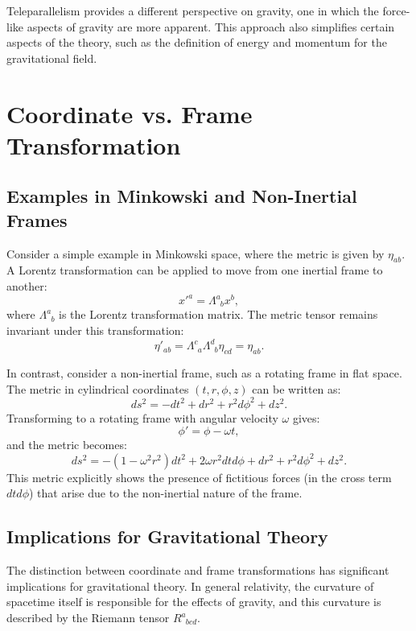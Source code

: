 \documentclass[12pt]{article}
\begin{document}
Teleparallelism provides a different perspective on gravity, one in which the force-like aspects of gravity are more apparent. This approach also simplifies certain aspects of the theory, such as the definition of energy and momentum for the gravitational field.

\section{Coordinate vs. Frame Transformation}
\subsection{Examples in Minkowski and Non-Inertial Frames}
Consider a simple example in Minkowski space, where the metric is given by \( \eta_{ab} \). A Lorentz transformation can be applied to move from one inertial frame to another:
\begin{equation}
x'^a = \Lambda^a_{\phantom{a}b} x^b,
\end{equation}
where \( \Lambda^a_{\phantom{a}b} \) is the Lorentz transformation matrix. The metric tensor remains invariant under this transformation:
\begin{equation}
\eta'_{ab} = \Lambda^c_{\phantom{c}a} \Lambda^d_{\phantom{d}b} \eta_{cd} = \eta_{ab}.
\end{equation}

In contrast, consider a non-inertial frame, such as a rotating frame in flat space. The metric in cylindrical coordinates \( (t, r, \phi, z) \) can be written as:
\begin{equation}
ds^2 = -dt^2 + dr^2 + r^2 d\phi^2 + dz^2.
\end{equation}
Transforming to a rotating frame with angular velocity \( \omega \) gives:
\begin{equation}
\phi' = \phi - \omega t,
\end{equation}
and the metric becomes:
\begin{equation}
ds^2 = -(1-\omega^2 r^2)dt^2 + 2\omega r^2 dt d\phi + dr^2 + r^2 d\phi^2 + dz^2.
\end{equation}
This metric explicitly shows the presence of fictitious forces (in the cross term \( dt d\phi \)) that arise due to the non-inertial nature of the frame.

\subsection{Implications for Gravitational Theory}
The distinction between coordinate and frame transformations has significant implications for gravitational theory. In general relativity, the curvature of spacetime itself is responsible for the effects of gravity, and this curvature is described by the Riemann tensor \( R^a_{\phantom{a}bcd} \).
\end{document}
